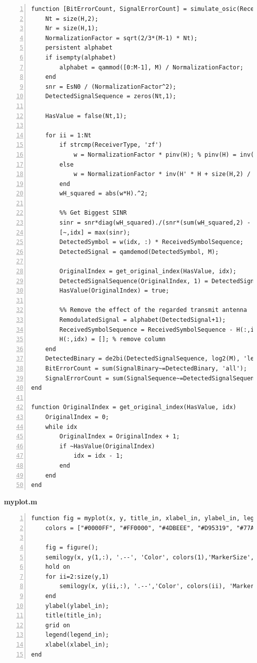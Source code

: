 \documentclass{article}
\newcommand{\bd}{\textbf} %
\begin{document}
\begin{lstlisting}[style=Matlab-editor, frame=single, numbers=left,]
function [BitErrorCount, SignalErrorCount] = simulate_osic(ReceivedSymbolSequence, SignalSequence, SignalBinary,  M, H, EsN0, ReceiverType)
    Nt = size(H,2);
    Nr = size(H,1);
    NormalizationFactor = sqrt(2/3*(M-1) * Nt);
    persistent alphabet
    if isempty(alphabet)
        alphabet = qammod([0:M-1], M) / NormalizationFactor;
    end
    snr = EsN0 / (NormalizationFactor^2);
    DetectedSignalSequence = zeros(Nt,1);
    
    HasValue = false(Nt,1);
    
    for ii = 1:Nt
        if strcmp(ReceiverType, 'zf')
            w = NormalizationFactor * pinv(H); % pinv(H) = inv(H' * H) * H'
        else
            w = NormalizationFactor * inv(H' * H + size(H,2) / EsN0 * eye(size(H,2))) * H';
        end
        wH_squared = abs(w*H).^2;
        
        %% Get Biggest SINR
        sinr = snr*diag(wH_squared)./(snr*(sum(wH_squared,2) - diag(wH_squared))+sum(abs(w).^2,2));
        [~,idx] = max(sinr);
        DetectedSymbol = w(idx, :) * ReceivedSymbolSequence;
        DetectedSignal = qamdemod(DetectedSymbol, M);
        
        OriginalIndex = get_original_index(HasValue, idx);
        DetectedSignalSequence(OriginalIndex, 1) = DetectedSignal;
        HasValue(OriginalIndex) = true;
        
        %% Remove the effect of the regarded transmit antenna
        RemodulatedSignal = alphabet(DetectedSignal+1);
        ReceivedSymbolSequence = ReceivedSymbolSequence - H(:,idx) * RemodulatedSignal;
        H(:,idx) = []; % remove column
    end
    DetectedBinary = de2bi(DetectedSignalSequence, log2(M), 'left-msb');
    BitErrorCount = sum(SignalBinary~=DetectedBinary, 'all');
    SignalErrorCount = sum(SignalSequence~=DetectedSignalSequence, 'all');
end

function OriginalIndex = get_original_index(HasValue, idx)
    OriginalIndex = 0;
    while idx
        OriginalIndex = OriginalIndex + 1;
        if ~HasValue(OriginalIndex)
            idx = idx - 1;
        end
    end
end
\end{lstlisting}
\noindent\bd{myplot.m}
\begin{lstlisting}[style=Matlab-editor, frame=single, numbers=left,]
function fig = myplot(x, y, title_in, xlabel_in, ylabel_in, legend_in)
    colors = ["#0000FF", "#FF0000", "#4DBEEE", "#D95319", "#77AC30", "#EDB120", "#7E2F8E"];
    
    fig = figure();
    semilogy(x, y(1,:), '.--', 'Color', colors(1),'MarkerSize', 15);
    hold on
    for ii=2:size(y,1)
        semilogy(x, y(ii,:), '.--','Color', colors(ii), 'MarkerSize', 15);
    end
    ylabel(ylabel_in);
    title(title_in);
    grid on
    legend(legend_in);
    xlabel(xlabel_in);
end    
\end{lstlisting}
\end{document}
